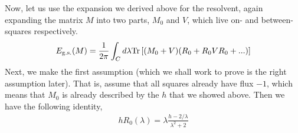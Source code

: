 \documentclass[11pt, oneside]{article} %
\numberwithin{equation}{section}
\begin{document}
Now, let us use the expansion we derived above for the resolvent, again expanding the matrix $M$ into two parts, $M_0$ and $V$, which live on- and between-squares respectively.
\begin{align}
    E_\textup{g.s.}(M) = \frac 1{2\pi} \int_C d\lambda \textup{Tr}\left [
        (M_0 + V)
        (R_0 + R_0 V R_0 + ...)\right ]
\end{align}
Next, we make the first assumption (which we shall work to prove is the right assumption later). That is, assume that all squares already have flux $-1$, which means that $M_0$ is already described by the $h$ that we showed above. Then we have the following identity,
\begin{align}
    h R_0(\lambda) = \lambda\frac{ h - 2/\lambda}{\lambda^2 + 2}
\end{align} 
\end{document}
